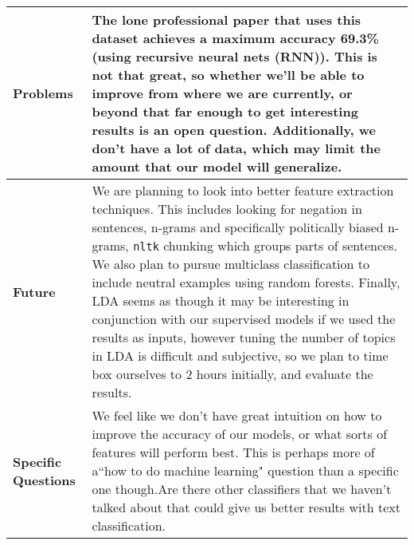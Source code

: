 \documentclass[11pt]{article}
\begin{document}
\begin{center}
\begin{tabular}{ | l | p{125mm} |  }
    \\ \hline
    \textbf{Problems} &  The lone professional paper that uses this dataset achieves a maximum accuracy 69.3\% (using recursive neural nets (RNN)). This is not that great, so whether we'll be able to improve from where we are currently, or beyond that far enough to get interesting results is an open question. Additionally, we don't have a lot of data, which may limit the amount that our model will generalize.  \\ \hline
    \textbf{Future} & We are planning to look into better feature extraction techniques. This includes looking for negation in sentences, n-grams and specifically politically biased n-grams, \texttt{nltk} chunking which groups parts of sentences. We also plan to pursue multiclass classification to include neutral examples using random forests. Finally, LDA seems as though it may be interesting in conjunction with our supervised models if we used the results as inputs, however tuning the number of topics in LDA is difficult and subjective, so we plan to time box ourselves to 2 hours initially, and evaluate the results. \\ \hline
    \textbf{Specific Questions} & We feel like we don't have great intuition on how to improve the accuracy of our models, or what sorts of features will perform best. This is perhaps more of a``how to do machine learning" question than a specific one though.Are there other classifiers that we haven't talked about that could give us better results with text classification. \\ \hline
  \end{tabular}
\end{center}
\end{document}
